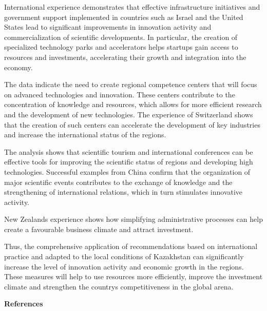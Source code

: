 \begin{multicols}{2}
International experience demonstrates that effective infrastructure
initiatives and government support implemented in countries such as
Israel and the United States lead to significant improvements in
innovation activity and commercialization of scientific developments. In
particular, the creation of specialized technology parks and
accelerators helps startups gain access to resources and investments,
accelerating their growth and integration into the economy.

The data indicate the need to create regional competence centers that
will focus on advanced technologies and innovation. These centers
contribute to the concentration of knowledge and resources, which allows
for more efficient research and the development of new technologies. The
experience of Switzerland shows that the creation of such centers can
accelerate the development of key industries and increase the
international status of the regions.

The analysis shows that scientific tourism and international conferences
can be effective tools for improving the scientific status of regions
and developing high technologies. Successful examples from China confirm
that the organization of major scientific events contributes to the
exchange of knowledge and the strengthening of international relations,
which in turn stimulates innovative activity.

New Zealand\textquotesingle s experience shows how simplifying
administrative processes can help create a favourable business climate
and attract investment.

Thus, the comprehensive application of recommendations based on
international practice and adapted to the local conditions of Kazakhstan
can significantly increase the level of innovation activity and economic
growth in the regions. These measures will help to use resources more
efficiently, improve the investment climate and strengthen the
country\textquotesingle s competitiveness in the global arena.
\end{multicols}

\begin{center}
{\bfseries References}
\end{center}

